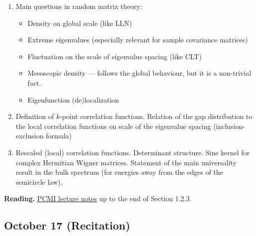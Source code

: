\documentclass[a4paper]{article}
\begin{document}
\begin{enumerate}
\item Main questions in random matrix theory:

\begin{itemize}
\item Density on global scale (like LLN)

\item Extreme eigenvalues (especially relevant for sample covariance matrices)

\item Fluctuation on the scale of eigenvalue spacing (like CLT)

\item Mesoscopic density — follows the global behaviour, but it is a non-trivial fact.

\item Eigenfunction (de)localization
\end{itemize}

\item Definition of $k$-point correlation functions. Relation of the gap distribution to the local correlation functions on scale of the eigenvalue spacing (inclusion-exclusion formula)

\item Rescaled (local) correlation functions. Determinant structure. Sine kernel for complex Hermitian Wigner matrices. Statement of the main universality result in the bulk spectrum (for energies away from the edges of the semicircle law).
\end{enumerate}

\textbf{Reading.} \href{pcmi.pdf}{PCMI lecture notes} up to the end of Section 1.2.3.


\subsection{October 17 (Recitation)%
  \label{october-17-recitation}%
}
\end{document}
